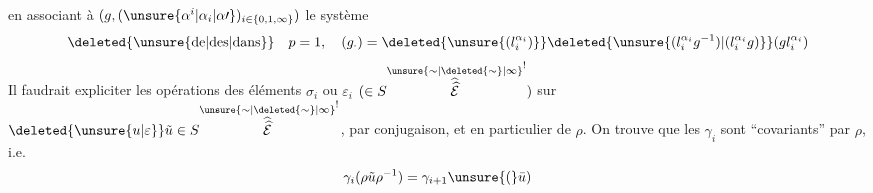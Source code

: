 en associant à $(g,(\unsure{\alpha^i|\alpha_i|\alpha\prime})_{i\in\{0,1,\infty\}})$ le système
\[
\deleted{\text{\unsure{de|des|dans}}}\quad p=1,\quad(g_\cdot)=\deleted{\unsure{(l_i^{\alpha_i})}}\deleted{\unsure{(l_i^{\alpha_i}g^{-1})|(l_i^{\alpha_i}g)}}(gl_i^{\alpha_i})
\]
Il faudrait expliciter les opérations des éléments $\sigma_i$ ou $\varepsilon_i$  $(\in S\overset{\unsure{\sim|\deleted{\sim}|\infty}}{\widehat{\widehat{\mathcal E}}}^{!})$ sur $\deleted{\unsure{u|\varepsilon}}\tilde u\in S\overset{\unsure{\sim|\deleted{\sim}|\infty}}{\widehat{\widehat{\mathcal E}}}^{!}$, par  conjugaison, et en particulier de $\rho$. On trouve que  les $\gamma_i$ sont ``covariants'' par $\rho$, i.e.
\[
\gamma_i(\rho\tilde u\rho^{-1})=\gamma_{i+1}\unsure{(}\bar u)
\]
